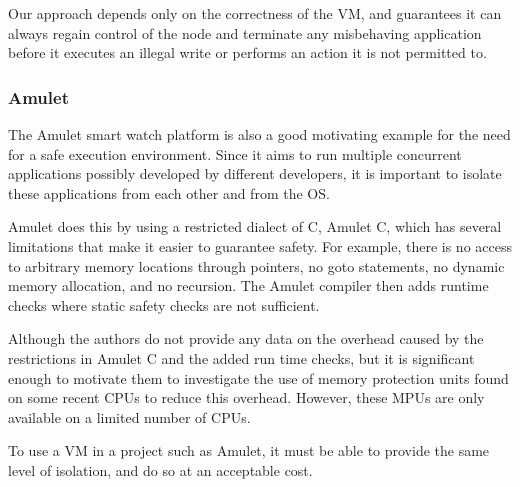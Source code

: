 Our approach depends only on the correctness of the VM, and guarantees it can always regain control of the node and terminate any misbehaving application before it executes an illegal write or performs an action it is not permitted to.

\subsubsection{Amulet}
The Amulet \cite{Hester:2016je} smart watch platform is also a good motivating example for the need for a safe execution environment. Since it aims to run multiple concurrent applications possibly developed by different developers, it is important to isolate these applications from each other and from the OS.

Amulet does this by using a restricted dialect of C, Amulet C, which has several limitations that make it easier to guarantee safety. For example, there is no access to arbitrary memory locations through pointers, no goto statements, no dynamic memory allocation, and no recursion. The Amulet compiler then adds runtime checks where static safety checks are not sufficient.

Although the authors do not provide any data on the overhead caused by the restrictions in Amulet C and the added run time checks, but it is significant enough to motivate them to investigate the use of memory protection units found on some recent CPUs \cite{Hardin:2017cq} to reduce this overhead. However, these MPUs are only available on a limited number of CPUs.

To use a VM in a project such as Amulet, it must be able to provide the same level of isolation, and do so at an acceptable cost.


